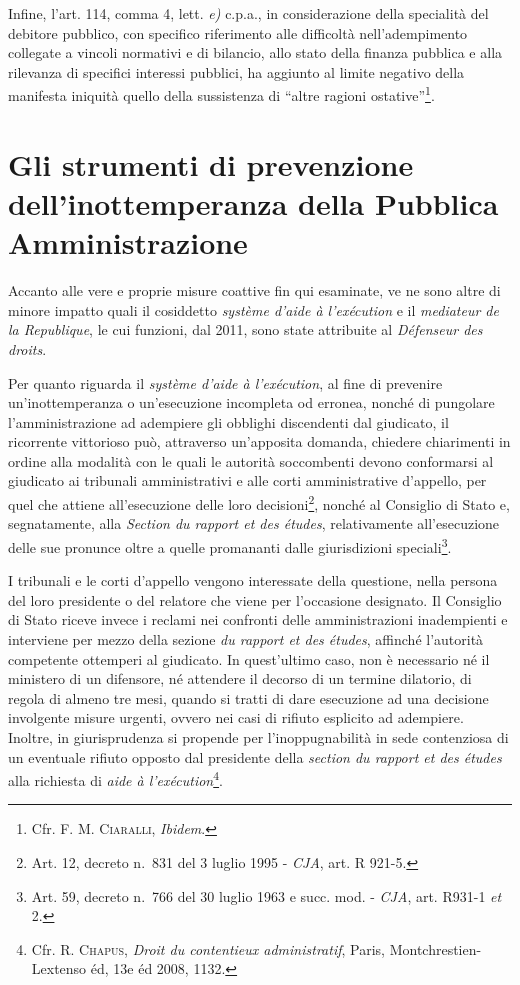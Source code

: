 \documentclass[12pt,it,a4paper,]{report}
\begin{document}
Infine, l'art. 114, comma 4, lett. \emph{e)} c.p.a., in considerazione
della specialità del debitore pubblico, con specifico riferimento alle
difficoltà nell'adempimento collegate a vincoli normativi e di bilancio,
allo stato della finanza pubblica e alla rilevanza di specifici
interessi pubblici, ha aggiunto al limite negativo della manifesta
iniquità quello della sussistenza di ``altre ragioni
ostative''\footnote{Cfr. F. M. \textsc{Ciaralli}, \emph{Ibidem}.}.

\hypertarget{gli-strumenti-di-prevenzione-dellinottemperanza-della-pubblica-amministrazione}{%
\section{Gli strumenti di prevenzione dell'inottemperanza della Pubblica
Amministrazione}\label{gli-strumenti-di-prevenzione-dellinottemperanza-della-pubblica-amministrazione}}

Accanto alle vere e proprie misure coattive fin qui esaminate, ve ne
sono altre di minore impatto quali il cosiddetto \emph{système d'aide à
l'exécution} e il \emph{mediateur de la Republique}, le cui funzioni,
dal 2011, sono state attribuite al \emph{Défenseur des droits}.

Per quanto riguarda il \emph{système d'aide à l'exécution}, al fine di
prevenire un'inottemperanza o un'esecuzione incompleta od erronea,
nonché di pungolare l'amministrazione ad adempiere gli obblighi
discendenti dal giudicato, il ricorrente vittorioso può, attraverso
un'apposita domanda, chiedere chiarimenti in ordine alla modalità con le
quali le autorità soccombenti devono conformarsi al giudicato ai
tribunali amministrativi e alle corti amministrative d'appello, per quel
che attiene all'esecuzione delle loro decisioni\footnote{Art. 12,
  decreto n.~831 del 3 luglio 1995 - \emph{CJA}, art. R 921-5.}, nonché
al Consiglio di Stato e, segnatamente, alla \emph{Section du rapport et
des études}, relativamente all'esecuzione delle sue pronunce oltre a
quelle promananti dalle giurisdizioni speciali\footnote{Art. 59, decreto
  n.~766 del 30 luglio 1963 e succ. mod. - \emph{CJA}, art. R931-1
  \emph{et} 2.}.

I tribunali e le corti d'appello vengono interessate della questione,
nella persona del loro presidente o del relatore che viene per
l'occasione designato. Il Consiglio di Stato riceve invece i reclami nei
confronti delle amministrazioni inadempienti e interviene per mezzo
della sezione \emph{du rapport et des études}, affinché l'autorità
competente ottemperi al giudicato. In quest'ultimo caso, non è
necessario né il ministero di un difensore, né attendere il decorso di
un termine dilatorio, di regola di almeno tre mesi, quando si tratti di
dare esecuzione ad una decisione involgente misure urgenti, ovvero nei
casi di rifiuto esplicito ad adempiere. Inoltre, in giurisprudenza si
propende per l'inoppugnabilità in sede contenziosa di un eventuale
rifiuto opposto dal presidente della \emph{section du rapport et des
études} alla richiesta di \emph{aide à l'exécution}\footnote{Cfr. R.
  \textsc{Chapus}, \emph{Droit du contentieux administratif}, Paris,
  Montchrestien-Lextenso éd, 13e éd 2008, 1132.}.
\end{document}
